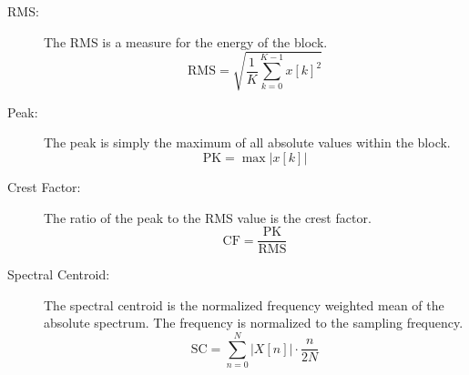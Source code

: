 \begin{description}
    \item[RMS:]
        The RMS is a measure for the energy of the block.
        \[
            \mathrm{RMS} = \sqrt{\frac{1}{K}\sum_{k=0}^{K-1}{x[k]^2}}
        \]
    \item[Peak:]
        The peak is simply the maximum of all absolute values within the block.
        \[
            \mathrm{PK} = \max{|x[k]|}
        \]
    \item[Crest Factor:]
        The ratio of the peak to the RMS value is the crest factor.
        \[
            \mathrm{CF} = \frac{\mathrm{PK}}{\mathrm{RMS}}
        \]
    \item[Spectral Centroid:]
        The spectral centroid is the normalized frequency weighted mean of the absolute spectrum. The frequency is normalized to the sampling frequency.
        \[
            \mathrm{SC} = \sum_{n=0}^{N}{|X[n]| \cdot \frac{n}{2N}}
        \]


\end{description}
